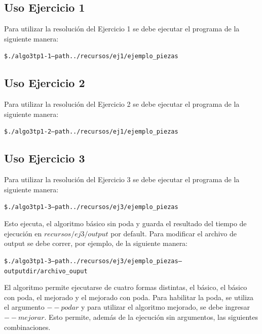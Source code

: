 \documentclass[11pt,a4paper]{article}
\begin{document}
\subsection*{Uso Ejercicio 1}

Para utilizar la resolución del Ejercicio 1 se debe ejecutar el programa de la siguiente manera:

\begin{alltt}
\$ ./algo3tp1 -1 --path ../recursos/ej1/ejemplo_piezas
\end{alltt}


\subsection*{Uso Ejercicio 2}

Para utilizar la resolución del Ejercicio 2 se debe ejecutar el programa de la siguiente manera:

\begin{alltt}
\$ ./algo3tp1 -2 --path ../recursos/ej1/ejemplo_piezas
\end{alltt}


\subsection*{Uso Ejercicio 3}

Para utilizar la resolución del Ejercicio 3 se debe ejecutar el programa de la siguiente manera:

\begin{alltt}
\$ ./algo3tp1 -3 --path ../recursos/ej3/ejemplo_piezas
\end{alltt}

Esto ejecuta, el algoritmo básico sin poda y guarda el resultado del tiempo de ejecución en $recursos/ej3/output$ por default. Para modificar el archivo de output se debe correr, por ejemplo, de la siguiente manera:

\begin{alltt}
\$ ./algo3tp1 -3 --path ../recursos/ej3/ejemplo_piezas --output dir/archivo_ouput
\end{alltt}

El algoritmo permite ejecutarse de cuatro formas distintas, el básico, el básico con poda, el mejorado y el mejorado con poda. Para habilitar la poda, se utiliza el argumento $--podar$ y para utilizar el algoritmo mejorado, se debe ingresar $--mejorar$. Esto permite, además de la ejecución sin argumentos, las siguientes combinaciones.
\end{document}
